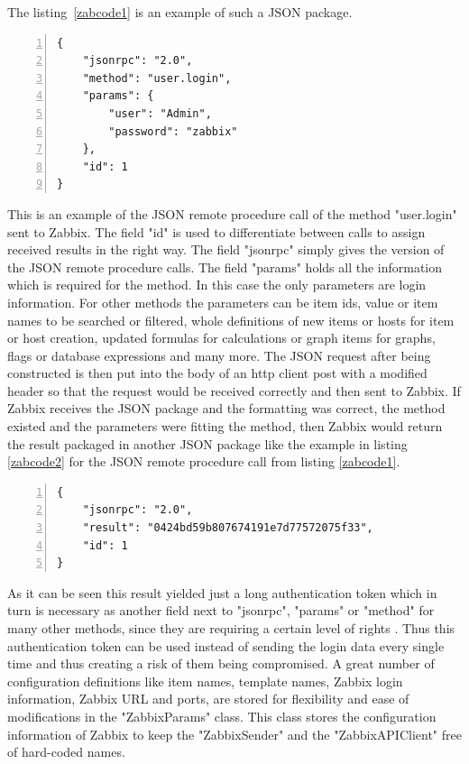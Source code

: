 The listing~\ref{zabcode1} is an example of such a JSON package.
\begin{lstlisting}[language=json_sw,caption={JSON authentication request \cite{zab3}},captionpos=b,numbers=left,label=zabcode1]
{
    "jsonrpc": "2.0",
    "method": "user.login",
    "params": {
        "user": "Admin",
        "password": "zabbix"
    },
    "id": 1
}\end{lstlisting} 
	This is an example of the JSON remote procedure call of the method "user.login" sent to Zabbix. The field "id" is used to differentiate between calls to assign received results in the right way. The field "jsonrpc" simply gives the version of the JSON remote procedure calls. The field "params" holds all the information which is required for the method. In this case the only parameters are login information. For other methods the parameters can be item ids, value or item names to be searched or filtered, whole definitions of new items or hosts for item or host creation, updated formulas for calculations or graph items for graphs, flags or database expressions and many more. The JSON request after being constructed is then put into the body of an http client post with a modified header so that the request would be received correctly and then sent to Zabbix. If Zabbix receives the JSON package and the formatting was correct, the method existed and the parameters were fitting the method, then Zabbix would return the result packaged in another JSON package like the example in listing \ref{zabcode2} for the JSON remote procedure call from listing \ref{zabcode1}.
	\begin{lstlisting}[language=json_sw,caption={JSON authentication response \cite{zab3}},captionpos=b,numbers=left,label=zabcode2]
{
    "jsonrpc": "2.0",
    "result": "0424bd59b807674191e7d77572075f33",
    "id": 1
}
\end{lstlisting}
	As it can be seen this result yielded just a long authentication token which in turn is necessary as another field next to "jsonrpc", "params" or "method" for many other methods, since they are requiring a certain level of rights \cite{zab3}. Thus this authentication token can be used instead of sending the login data every single time and thus creating a risk of them being compromised.
	A great number of configuration definitions like item names, template names, Zabbix login information, Zabbix URL and ports, are stored for flexibility and ease of modifications in the "ZabbixParams" class. This class stores the configuration information of Zabbix to keep the "ZabbixSender" and the "ZabbixAPIClient" free of hard-coded names.
